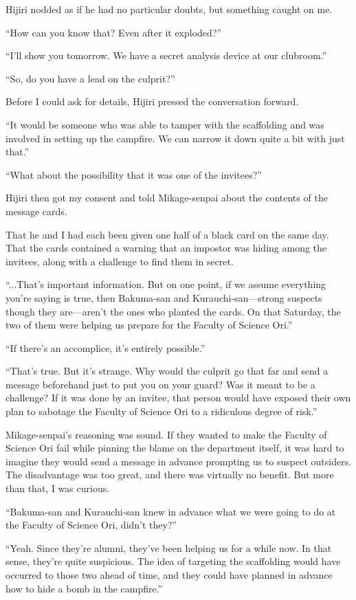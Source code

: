 \documentclass[
    a4paper,
    12pt,
    twoside,
    openany,
    UTF8,
    fontset=windows
]{ctexbook}
\begin{document}
Hijiri nodded as if he had no particular doubts, but something caught on me.

``How can you know that? Even after it exploded?''

``I'll show you tomorrow. We have a secret analysis device at our clubroom.''

``So, do you have a lead on the culprit?''

Before I could ask for details, Hijiri pressed the conversation forward.

``It would be someone who was able to tamper with the scaffolding and was involved in setting up the campfire. We can narrow it down quite a bit with just that.''

``What about the possibility that it was one of the invitees?''

Hijiri then got my consent and told Mikage-senpai about the contents of the message cards.

That he and I had each been given one half of a black card on the same day. That the cards contained a warning that an impostor was hiding among the invitees, along with a challenge to find them in secret.

``...That's important information. But on one point, if we assume everything you're saying is true, then Bakuma-san and Kurauchi-san---strong suspects though they are---aren't the ones who planted the cards. On that Saturday, the two of them were helping us prepare for the Faculty of Science Ori.''

``If there's an accomplice, it's entirely possible.''

``That's true. But it's strange. Why would the culprit go that far and send a message beforehand just to put you on your guard? Was it meant to be a challenge? If it was done by an invitee, that person would have exposed their own plan to sabotage the Faculty of Science Ori to a ridiculous degree of risk.''

Mikage-senpai's reasoning was sound. If they wanted to make the Faculty of Science Ori fail while pinning the blame on the department itself, it was hard to imagine they would send a message in advance prompting us to suspect outsiders. The disadvantage was too great, and there was virtually no benefit. But more than that, I was curious.

``Bakuma-san and Kurauchi-san knew in advance what we were going to do at the Faculty of Science Ori, didn't they?''

``Yeah. Since they're alumni, they've been helping us for a while now. In that sense, they're quite suspicious. The idea of targeting the scaffolding would have occurred to those two ahead of time, and they could have planned in advance how to hide a bomb in the campfire.''
\end{document}
